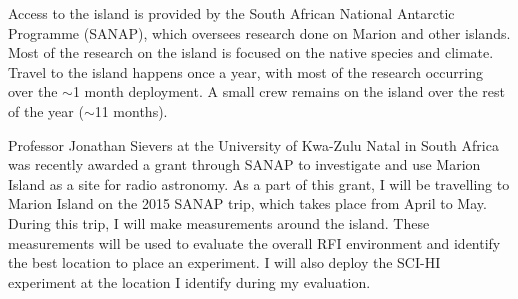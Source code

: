 Access to the island is provided by the South African National Antarctic Programme (SANAP), which oversees research done on Marion and other islands. Most of the research on the island is focused on the native species and climate. Travel to the island happens once a year, with most of the research occurring over the $\sim$1 month deployment. A small crew remains on the island over the rest of the year ($\sim$11 months). 

Professor Jonathan Sievers at the University of Kwa-Zulu Natal in South Africa was recently awarded a grant through SANAP to investigate and use Marion Island as a site for radio astronomy. As a part of this grant, I will be travelling to Marion Island on the 2015 SANAP trip, which takes place from April to May. During this trip, I will make measurements around the island. These measurements will be used to evaluate the overall RFI environment and identify the best location to place an experiment. I will also deploy the SCI-HI experiment at the location I identify during my evaluation. 

